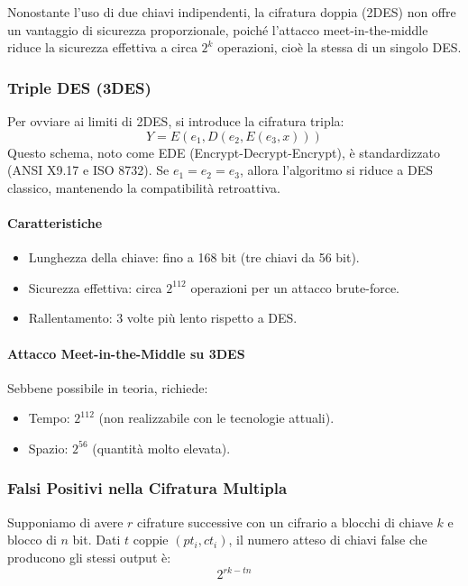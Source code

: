 \documentclass{report}
\begin{document}
Nonostante l’uso di due chiavi indipendenti, la cifratura doppia (2DES) non offre un vantaggio di sicurezza proporzionale, poiché l’attacco meet-in-the-middle riduce la sicurezza effettiva a circa $2^k$ operazioni, cioè la stessa di un singolo DES.

\subsubsection{Triple DES (3DES)}

Per ovviare ai limiti di 2DES, si introduce la cifratura tripla:
\[
Y = E(e_1, D(e_2, E(e_3, x)))
\]
Questo schema, noto come EDE (Encrypt-Decrypt-Encrypt), è standardizzato (ANSI X9.17 e ISO 8732). Se $e_1 = e_2 = e_3$, allora l’algoritmo si riduce a DES classico, mantenendo la compatibilità retroattiva.

\paragraph{Caratteristiche}

\begin{itemize}
    \item Lunghezza della chiave: fino a 168 bit (tre chiavi da 56 bit).
    \item Sicurezza effettiva: circa $2^{112}$ operazioni per un attacco brute-force.
    \item Rallentamento: 3 volte più lento rispetto a DES.
\end{itemize}

\paragraph{Attacco Meet-in-the-Middle su 3DES}

Sebbene possibile in teoria, richiede:
\begin{itemize}
    \item Tempo: $2^{112}$ (non realizzabile con le tecnologie attuali).
    \item Spazio: $2^{56}$ (quantità molto elevata).
\end{itemize}

\subsubsection{Falsi Positivi nella Cifratura Multipla}

\begin{theorem}
Supponiamo di avere $r$ cifrature successive con un cifrario a blocchi di chiave $k$ e blocco di $n$ bit. Dati $t$ coppie $(pt_i, ct_i)$, il numero atteso di chiavi false che producono gli stessi output è:
\[
2^{rk - tn}
\]
\end{theorem}
\end{document}
